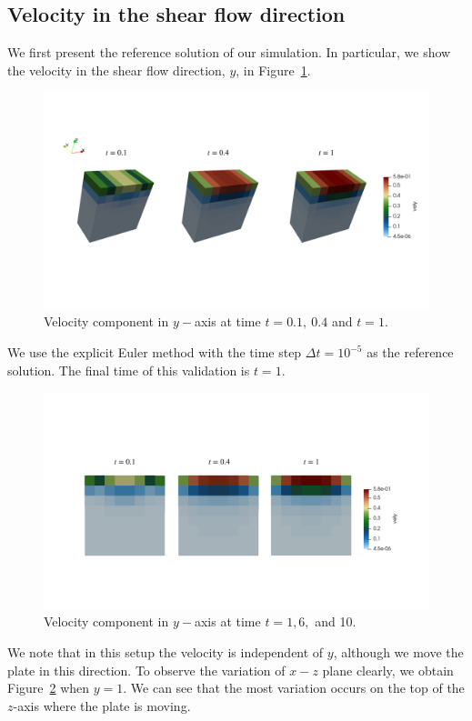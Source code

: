\subsection{Velocity in the shear flow direction}
 We first present the reference solution of our simulation. In particular, we show the velocity in the shear flow direction, $y$, in Figure~\ref{fig_reference_3d_T110}.
\begin{figure}[ht]
\begin{center}
  \includegraphics[scale=0.23]{figures/fig_reference_3d_T110.pdf}
  \end{center}
\caption{Velocity component in $y-$axis at time $t = 0.1, \ 0.4$ and $t = 1$.}
\label{fig_reference_3d_T110}
\end{figure}
We use the explicit Euler method with the time step $\Delta t = 10^{-5}$ as the reference solution. The final time of this validation is $t = 1$.
\begin{figure}[ht]
  \begin{center}
    \includegraphics[scale=0.25]{figures/fig_reference_T1610.pdf}
    \end{center}
  \caption{Velocity component in $y-$axis at time $t = 1, 6,$ and 10.}
  \label{fig_rerference_T1}
\end{figure}
\par
We note that in this setup the velocity is independent of $y$, although we move the plate in this direction. To observe the variation of $x-z$ plane clearly, we obtain Figure~\ref{fig_rerference_T1} when $y = 1$. We can see that the most variation occurs on the top of the $z$-axis where the plate is moving. 

